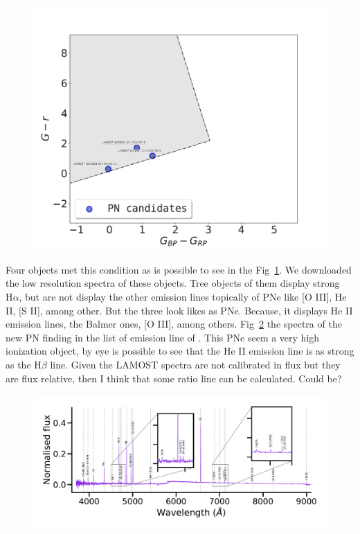 \documentclass[twocolumn]{article}
\newcommand\ha{\ensuremath{\mathrm{H\alpha}}}
\begin{document}
\begin{figure}
\centering
  \includegraphics[width=0.9\linewidth]{../Figs/pn-candidates-gaiaDR3.pdf}
  \caption{} 
  \label{fig:gaia-ps-apply}
\end{figure}

Four objects met this  condition as is possible to see in the Fig~\ref{fig:gaia-ps-apply}.
We downloaded the low resolution spectra of these objects. 
Tree objects of them display strong \ha{}, but are not display the other emission lines topically
of PNe like [O III], He II, [S II], among other. But the three look likes as PNe.
Because, it displays He II emission lines, the Balmer ones, [O III], among others.
Fig~\ref{fig:spectra} the spectra of the new PN finding in the list of emission line of
\citet{Skoda:2020}. This PNe seem a very high ionization object, by eye is possible to see
that the He II emission line is as strong as the H$\beta$ line. Given the LAMOST spectra
are not calibrated in flux but they are flux relative, then I think that some ratio line can be calculated. Could be?

\begin{figure}
\centering
  \includegraphics[width=0.9\linewidth]{../Spectra-lamostdr7/spec-56581-VB031N50V1_sp08-218.pdf}
  \caption{} 
  \label{fig:spectra}
\end{figure}
\end{document}
